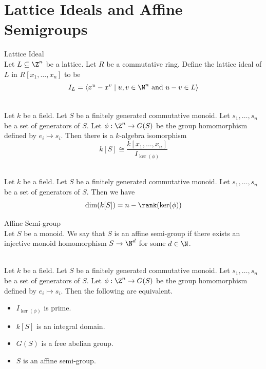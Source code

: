 \documentclass[a4paper]{article}
\begin{document}
\pagebreak
\section{Lattice Ideals and Affine Semigroups}
\begin{defn}{Lattice Ideal}{}\\
Let $L\subseteq\Z^n$ be a lattice. Let $R$ be a commutative ring. Define the lattice ideal of $L$ in $R[x_1,\dots,x_n]$ to be $$I_L=\langle x^u-x^v\;|\;u,v\in\N^n\text{ and }u-v\in L\rangle$$
\end{defn}

\begin{prp}{}{}\\
Let $k$ be a field. Let $S$ be a finitely generated commutative monoid. Let $s_1,\dots,s_n$ be a set of generators of $S$. Let $\phi:\Z^n\to G(S)$ be the group homomorphism defined by $e_i\mapsto s_i$. Then there is a $k$-algebra isomorphism $$k[S]\cong\frac{k[x_1,\dots,x_n]}{I_{\ker(\phi)}}$$
\end{prp}

\begin{prp}{}{}\\
Let $k$ be a field. Let $S$ be a finitely generated commutative monoid. Let $s_1,\dots,s_n$ be a set of generators of $S$. Then we have $$\dim(k[S])=n-\rank(\ker(\phi))$$
\end{prp}

\begin{defn}{Affine Semi-group}{}\\
Let $S$ be a monoid. We say that $S$ is an affine semi-group if there exists an injective monoid homomorphism $S\to\N^d$ for some $d\in\N$. 
\end{defn}

\begin{prp}{}{}\\
Let $k$ be a field. Let $S$ be a finitely generated commutative monoid. Let $s_1,\dots,s_n$ be a set of generators of $S$. Let $\phi:\Z^n\to G(S)$ be the group homomorphism defined by $e_i\mapsto s_i$. Then the following are equivalent. 
\begin{itemize}
\item $I_{\ker(\phi)}$ is prime. 
\item $k[S]$ is an integral domain. 
\item $G(S)$ is a free abelian group. 
\item $S$ is an affine semi-group. 
\end{itemize}
\end{prp}
\end{document}
